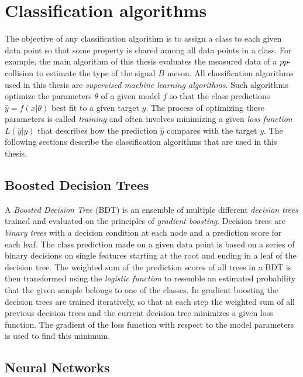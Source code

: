 \section{Classification algorithms}

The objective of any classification algorithm is to assign a class to each given data point so that some property is shared among all data points in a class.
For example, the main algorithm of this thesis evaluates the measured data of a $pp$-collision to estimate the type of the signal $B$ meson.
All classification algorithms used in this thesis are \emph{supervised machine learning algorithms}.
Such algorithms optimize the parameters $\theta$ of a given model $f$ so that the class predictions $\hat{y}=f(x|\theta)$ best fit to a given target $y$.
The process of optimizing these parameters is called \emph{training} and often involves minimizing a given \emph{loss function} $L(\hat{y}|y)$ that describes how the prediction $\hat{y}$ compares with the target $y$. 
The following sections describe the classification algorithms that are used in this thesis.

\subsection{Boosted Decision Trees}
\label{sec:BDT}

A \emph{Boosted Decision Tree} (BDT) is an ensemble of multiple different \emph{decision trees} trained and evaluated on the principles of \emph{gradient boosting}.
Decision trees are \emph{binary trees} with a decision condition at each node and a prediction score for each leaf.
The class prediction made on a given data point is based on a series of binary decisions on single features starting at the root and ending in a leaf of the decision tree.
The weighted sum of the prediction scores of all trees in a BDT is then transformed using the \emph{logistic function} to resemble an estimated probability that the given sample belongs to one of the classes.
In gradient boosting the decision trees are trained iteratively, so that at each step the weighted sum of all previous decision trees and the current decision tree minimizes a given loss function. 
The gradient of the loss function with respect to the model parameters is used to find this minimum.

\subsection{Neural Networks}
\label{sec:NN}

